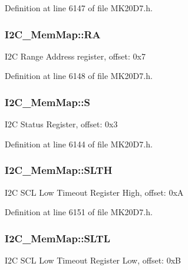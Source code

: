 Definition at line 6147 of file M\+K20\+D7.\+h.

\subsubsection[{\texorpdfstring{RA}{RA}}]{ I2\+C\+\_\+\+Mem\+Map\+::\+RA}\hypertarget{struct_i2_c___mem_map_a9f17398ec3278c30924dd797dea9788a}{}\label{struct_i2_c___mem_map_a9f17398ec3278c30924dd797dea9788a}
I2C Range Address register, offset\+: 0x7 

Definition at line 6148 of file M\+K20\+D7.\+h.

\subsubsection[{\texorpdfstring{S}{S}}]{ I2\+C\+\_\+\+Mem\+Map\+::S}\hypertarget{struct_i2_c___mem_map_acba6223219d3887b1ba085cf199bf84a}{}\label{struct_i2_c___mem_map_acba6223219d3887b1ba085cf199bf84a}
I2C Status Register, offset\+: 0x3 

Definition at line 6144 of file M\+K20\+D7.\+h.

\subsubsection[{\texorpdfstring{S\+L\+TH}{SLTH}}]{ I2\+C\+\_\+\+Mem\+Map\+::\+S\+L\+TH}\hypertarget{struct_i2_c___mem_map_aac56d4be80ad622d7bf85bdd8c29504c}{}\label{struct_i2_c___mem_map_aac56d4be80ad622d7bf85bdd8c29504c}
I2C S\+CL Low Timeout Register High, offset\+: 0xA 

Definition at line 6151 of file M\+K20\+D7.\+h.

\subsubsection[{\texorpdfstring{S\+L\+TL}{SLTL}}]{ I2\+C\+\_\+\+Mem\+Map\+::\+S\+L\+TL}\hypertarget{struct_i2_c___mem_map_afd5aa3cef3245893addeb55556e1ceff}{}\label{struct_i2_c___mem_map_afd5aa3cef3245893addeb55556e1ceff}
I2C S\+CL Low Timeout Register Low, offset\+: 0xB 

